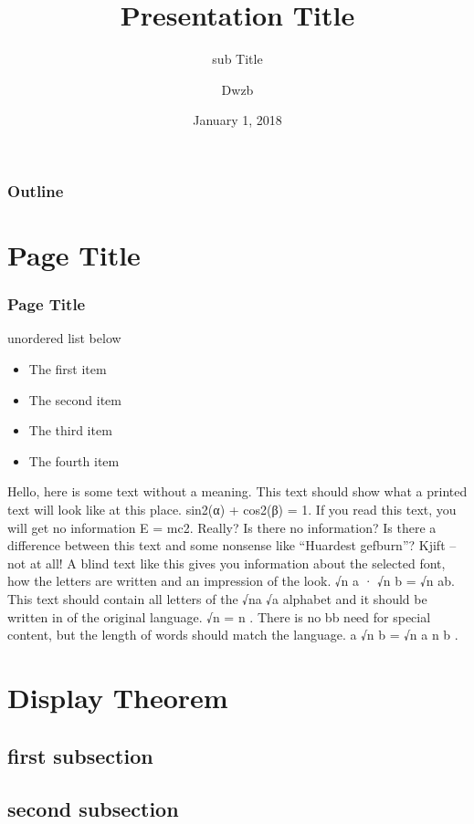 \documentclass[aspectratio=169]{beamer}
\author{Dwzb}
\title{Presentation Title}
\subtitle{sub Title}
\date{January 1, 2018}
\begin{document}
    \frame[plain]{\titlepage}

    \begin{frame}
        \frametitle{Outline}
        \tableofcontents
    \end{frame}

    \section{Page Title}

    \begin{frame}
        \frametitle{Page Title}

        \vspace{0.4cm}

        unordered list below

        \begin{itemize}
            \item The first item
            \item The second item
            \item The third item
            \item The fourth item
        \end{itemize}
        Hello, here is some text without a meaning. This text should show what a printed text will look like at this place. sin2(α) + cos2(β) = 1. If you read this text, you will get no information E = mc2. Really? Is there no information? Is there a difference between this text and some nonsense like “Huardest gefburn”? Kjift – not at all! A blind text like this gives you information about the selected font, how the letters are written and
        an impression of the look. √n a · √n b = √n ab. This text should contain all letters of the √na √a
        alphabet and it should be written in of the original language. √n = n . There is no bb
        need for special content, but the length of words should match the language. a √n b = √n a n b .

    \end{frame}

    \section{Display Theorem}

    \subsection{first subsection}

    \subsection{second subsection}
\end{document}
